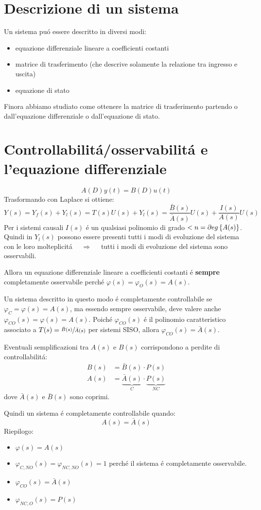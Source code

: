 \documentclass[../main.tex]{subfiles}
\begin{document}
	\section{Descrizione di un sistema}
	Un sistema pu\'o essere descritto in diversi modi:
	\begin{itemize}
		\item 
			equazione differenziale lineare a coefficienti costanti
		\item 
			matrice di trasferimento (che descrive solamente la relazione tra ingresso e uscita)
		\item 
			equazione di stato
	\end{itemize}
	
	Finora abbiamo studiato come ottenere la matrice di trasferimento partendo o dall'equazione differenziale o dall'equazione di stato.
	
	\section{Controllabilit\'a/osservabilit\'a e l'equazione differenziale}
		\label{sec:sistema_eq_diff}
		\[
			A(D)y(t) = B(D)u(t)
		\]
		Trasformando con Laplace si ottiene:
		\[
			Y(s) = Y_f(s) + Y_l(s) = T(s)U(s) + Y_l(s) = \dfrac{\bar B(s)}{\bar{A}(s)} U(s) + \dfrac{I(s)}{A(s)} U(s)
		\]
		Per i sistemi causali $ I(s) $ \'e un qualsiasi polinomio di grado $ < n = \partial eg \left\lbrace A(s) \right\rbrace $. Quindi in $ Y_l(s) $ possono essere presenti tutti i modi di evoluzione del sistema con le loro molteplicit\'a $ \quad\Rightarrow\quad $ tutti i modi di evoluzione del sistema sono osservabili.
		
		Allora un equazione differenziale lineare a coefficienti costanti \'e \textbf{sempre} completamente osservabile perch\'e $ \varphi(s) = \varphi_O(s) = A(s) $.
		
		Un sistema descritto in questo modo \'e completamente controllabile se $ \varphi_C = \varphi(s) = A(s) $, ma essendo sempre osservabile, deve valere anche  $ \varphi_{CO}(s) = \varphi(s) = A(s) $. Poich\'e $ \varphi_{CO}(s) $ \'e il polinomio caratteristico associato a $ T(s) = \sfrac{\bar B(s)}{\bar A(s)} $ per sistemi SISO, allora $ \varphi_{CO}(s) = \bar A(s) $.
		
		Eventuali semplificazioni tra $ A(s) $ e $ B(s) $ corrispondono a perdite di controllabilit\'a:
		\begin{align*}
			B(s) &= \bar B(s) \cdot P(s)\\
			A(s) &= \underbrace{\bar{A}(s)}_{C} \cdot \underbrace{P(s)}_{NC}
		\end{align*}
		dove $ \bar A(s) $ e $ \bar B(s) $ sono coprimi.
		
		Quindi un sistema \'e completamente controllabile quando: 
		\[
			A(s) = \bar A(s)
		\]
		\newline
		Riepilogo:
		\begin{itemize}
			\item $ \varphi(s) = A(s) $
			\item $ \varphi_{C,NO}(s) = \varphi_{NC,NO}(s) = 1 $ perch\'e il sistema \'e completamente osservabile.
			\item $ \varphi_{CO}(s) = \bar A(s) $
			\item $ \varphi_{NC,O}(s) = P(s) $
		\end{itemize}
\end{document}
